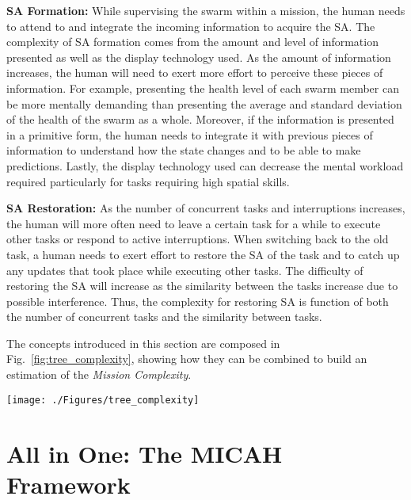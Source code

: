 \documentclass[journal]{IEEEtran}
\begin{document}
\textbf{SA Formation: }
While supervising the swarm within a mission, the human needs to attend to and integrate the incoming information to acquire the SA. The complexity of SA formation comes from the amount and level of information presented as well as the display technology used. 
As the amount of information increases, the human will need to exert more effort to perceive these pieces of information. For example, presenting the health level of each swarm member can be more mentally demanding than presenting the average and standard deviation of the health of the swarm as a whole.  
Moreover, if the information is presented in a primitive form, the human needs to integrate it with  previous pieces of information to understand how the state changes and to be able to make predictions. 
Lastly, the display technology used can decrease the mental workload required particularly for tasks requiring high spatial skills.

\textbf{SA Restoration: }
As the number of concurrent tasks and interruptions increases, the human will more often need to leave a certain task for a while to execute other tasks or respond to active interruptions.
When switching back to the old task, a human needs to exert effort to restore the SA of the task and to catch up any updates that took place while executing other tasks. 
The difficulty of restoring the SA will increase as the similarity between the tasks increase due to possible interference. 
Thus, the complexity for restoring SA is function of both the number of concurrent tasks and the similarity between tasks.

The concepts introduced in this section are composed in Fig.~\ref{fig:tree_complexity}, showing how they can be combined to build an estimation of the \textit{Mission Complexity}.
\begin{figure*}[tp]
\centering
\texttt{[image: ./Figures/tree\_complexity]}
\caption{Components of mission complexity.}
\label{fig:tree_complexity}
\end{figure*}

\section{All in One: The MICAH Framework}
\label{implications}
\end{document}
